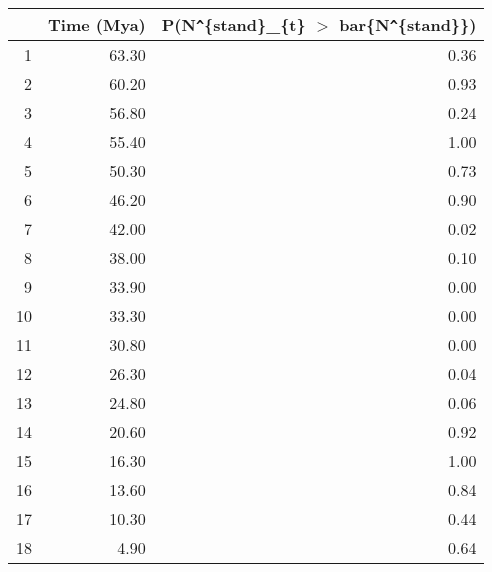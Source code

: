 \begin{table}[ht]
\centering
\begin{tabular}{rrr}
  \hline
 & Time (Mya) & P(N\verb|^|\{stand\}\_\{t\} $>$ bar\{N\verb|^|\{stand\}\}) \\ 
  \hline
1 & 63.30 & 0.36 \\ 
  2 & 60.20 & 0.93 \\ 
  3 & 56.80 & 0.24 \\ 
  4 & 55.40 & 1.00 \\ 
  5 & 50.30 & 0.73 \\ 
  6 & 46.20 & 0.90 \\ 
  7 & 42.00 & 0.02 \\ 
  8 & 38.00 & 0.10 \\ 
  9 & 33.90 & 0.00 \\ 
  10 & 33.30 & 0.00 \\ 
  11 & 30.80 & 0.00 \\ 
  12 & 26.30 & 0.04 \\ 
  13 & 24.80 & 0.06 \\ 
  14 & 20.60 & 0.92 \\ 
  15 & 16.30 & 1.00 \\ 
  16 & 13.60 & 0.84 \\ 
  17 & 10.30 & 0.44 \\ 
  18 & 4.90 & 0.64 \\ 
   \hline
\end{tabular}
\label{tab:div_peak}
\end{table}
